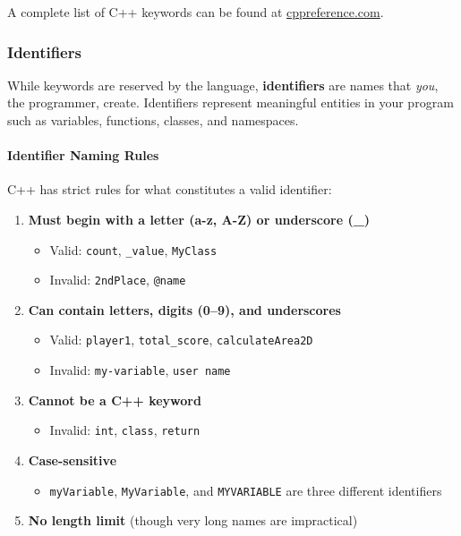 A complete list of C++ keywords can be found at \href{https://en.cppreference.com/w/cpp/keyword}{cppreference.com}.

\subsubsection{Identifiers}

While keywords are reserved by the language, \textbf{identifiers} are names that \textit{you}, the programmer, create. Identifiers represent meaningful entities in your program such as variables, functions, classes, and namespaces.

\paragraph{Identifier Naming Rules}

C++ has strict rules for what constitutes a valid identifier:

\begin{enumerate}
	\item \textbf{Must begin with a letter (a-z, A-Z) or underscore (\_)}
	\begin{itemize}
		\item Valid: \texttt{count}, \texttt{\_value}, \texttt{MyClass}
		\item Invalid: \texttt{2ndPlace}, \texttt{@name}
	\end{itemize}
	
	\item \textbf{Can contain letters, digits (0--9), and underscores}
	\begin{itemize}
		\item Valid: \texttt{player1}, \texttt{total\_score}, \texttt{calculateArea2D}
		\item Invalid: \texttt{my-variable}, \texttt{user name}
	\end{itemize}
	
	\item \textbf{Cannot be a C++ keyword}
	\begin{itemize}
		\item Invalid: \texttt{int}, \texttt{class}, \texttt{return}
	\end{itemize}
	
	\item \textbf{Case-sensitive}
	\begin{itemize}
		\item \texttt{myVariable}, \texttt{MyVariable}, and \texttt{MYVARIABLE} are three different identifiers
	\end{itemize}
	
	\item \textbf{No length limit} (though very long names are impractical)
\end{enumerate}


